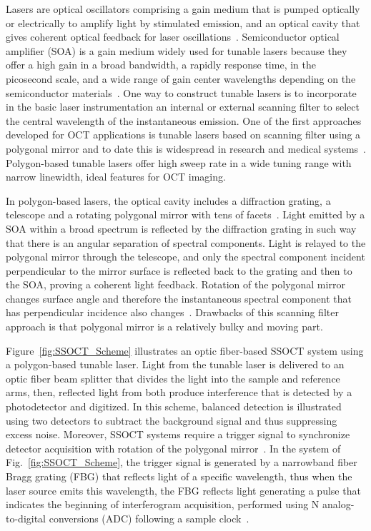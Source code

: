Lasers are optical oscillators comprising a gain medium that is pumped optically or electrically to amplify light by stimulated emission, and an optical cavity that gives coherent optical feedback for laser oscillations~\cite{Saleh1991_Fundamentals}. Semiconductor optical amplifier (SOA) is a gain medium widely used for tunable lasers because they offer a high gain in a broad bandwidth, a rapidly response time, in the picosecond scale, and a wide range of gain center wavelengths depending on the semiconductor materials~\cite{Yun2015_Wavelength}. One way to construct tunable lasers is to incorporate in the basic laser instrumentation an internal or external scanning filter to select the central wavelength of the instantaneous emission. One of the first approaches developed for OCT applications is tunable lasers based on scanning filter using a polygonal mirror and to date this is widespread in research and medical systems~\cite{Yun2003_Highspeed}. Polygon-based tunable lasers offer high sweep rate in a wide tuning range with narrow linewidth, ideal features for OCT imaging.

In polygon-based lasers, the optical cavity includes a diffraction grating, a telescope and a rotating polygonal mirror with tens of facets~\cite{Yun2003_Highspeed}. Light emitted by a SOA within a broad spectrum is reflected by the diffraction grating in such way that there is an angular separation of spectral components. Light is relayed to the polygonal mirror through the telescope, and only the spectral component incident perpendicular to the mirror surface is reflected back to the grating and then to the SOA, proving a coherent light feedback. Rotation of the polygonal mirror changes surface angle and therefore the instantaneous spectral component that has perpendicular incidence also changes~\cite{Yun2003_Highspeed}. Drawbacks of this scanning filter approach is that polygonal mirror is a relatively bulky and moving part.

Figure~\ref{fig:SSOCT_Scheme} illustrates an optic fiber-based SSOCT system using a polygon-based tunable laser. Light from the tunable laser is delivered to an optic fiber beam splitter that divides the light into the sample and reference arms, then, reflected light from both produce interference that is detected by a photodetector and digitized. In this scheme, balanced detection is illustrated using two detectors to subtract the background signal and thus suppressing excess noise\cite{Podoleanu2000_Unbalanced}. Moreover, SSOCT systems require a trigger signal to synchronize detector acquisition with rotation of the polygonal mirror~\cite{Vakoc2005_Phaseresolved}. In the system of Fig.~\ref{fig:SSOCT_Scheme}, the trigger signal is generated by a narrowband fiber Bragg grating (FBG) that reflects light of a specific wavelength, thus when the laser source emits this wavelength, the FBG reflects light generating a pulse that indicates the beginning of interferogram acquisition, performed using N analog-to-digital conversions (ADC) following a sample clock~\cite{Vakoc2005_Phaseresolved}.

